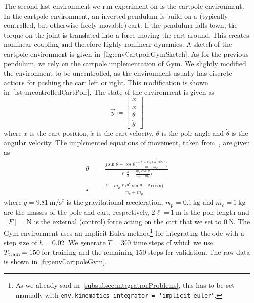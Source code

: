 			The second last environment we run experiment on is the cartpole environment. In the cartpole environment, an inverted pendulum is build on a (typically controlled, but otherwise freely movable) cart. If the pendulum falls town, the torque on the joint is translated into a force moving the cart around. This creates nonlinear coupling and therefore highly nonlinear dynamics. A sketch of the cartpole environment is given in~\autoref{fig:envCartpoleGymSketch}. As for the previous pendulum, we rely on the cartpole implementation of Gym. We slightly modified the environment to be uncontrolled, as the environment usually has discrete actions for pushing the cart left or right. This modification is shown in~\autoref{lst:uncontrolledCartPole}. The state of the environment is given as
			\begin{equation*}
				\vec{y} \coloneqq
					\begin{bmatrix}
						x \\
						\dot{x} \\
						\theta \\
						\dot{\theta}
					\end{bmatrix}
			\end{equation*}
			where \(x\) is the cart position, \(\dot{x}\) is the cart velocity, \(\theta\) is the pole angle and \(\dot{\theta}\) is the angular velocity. The implemented equations of movement, taken from~\cite{florianCorrectEquationsDynamics2005}, are given as
			\begin{align*}
				\ddot{\theta} &= \frac{g \sin\theta + \cos\theta \Big(\! \frac{-F - m_p \ell \dot{\theta}^2 \sin\theta}{m_c + m_p} \!\Big)}{\ell \Big(\! \frac{4}{3} - \frac{m_p \cos^2\theta}{m_c + m_p} \!\Big)} \\
				\ddot{x} &= \frac{F + m_p \ell \big( \dot{\theta}^2 \sin\theta - \ddot{\theta} \cos\theta \big)}{m_c + m_p}
			\end{align*}
			where \( g = \SI{9.81}{\meter\per\second\squared} \) is the gravitational acceleration, \( m_p = \SI{0.1}{\kilogram} \) and \( m_c = \SI{1}{\kilogram} \) are the masses of the pole and cart, respectively, \( 2\ell = \SI{1}{\meter} \) is the pole length and \( [F] = \si{\newton} \) is the external (control) force acting on the cart that we set to \( \SI{0}{\newton} \). The Gym environment uses an implicit Euler method\footnote{As we already said in~\autoref{subsubsec:integrationProblems}, this has to be set manually with \lstinline|env.kinematics_integrator = 'implicit-euler'|.} for integrating the \ac{ode} with a step size of \( h = 0.02 \). We generate \( T = 300 \) time steps of which we use \( T_{\mathrm{train}} = 150 \) for training and the remaining \(150\) steps for validation. The raw data is shown in~\autoref{fig:envCartpoleGym}.

